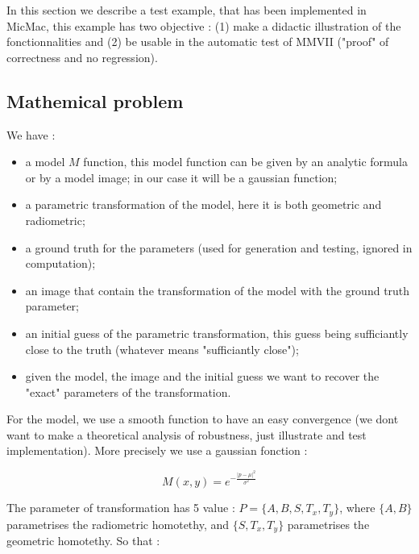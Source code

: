In this section we describe a test example, that has been implemented in MicMac, this example 
has two objective : (1) make a didactic illustration of the fonctionnalities and (2) 
be usable in the automatic test of MMVII ("proof" of correctness and no regression).

\subsection{Mathemical problem}

We have :

\begin {itemize}
    \item a model $M$  function, this model function can be given by an analytic  formula or by a model image;
          in our case it will be a gaussian function;

    \item a parametric transformation of the model, here it is both geometric and radiometric;

    \item a ground truth for the parameters (used for generation and testing, ignored in computation);

    \item an image that contain the transformation of the model with the ground truth parameter;

    \item an initial guess of the parametric transformation, this guess being sufficiantly close to the
	    truth (whatever means "sufficiantly close");

     \item given the model, the image and the initial guess we want to recover the "exact" parameters of the 
           transformation.

\end {itemize}

For the model, we use  a smooth function to have an easy convergence (we dont want to 
make a theoretical analysis of robustness, just illustrate and test implementation).
More precisely we use a gaussian fonction :

\begin{equation}
	M(x,y) =  e^{-\frac{|p-\mu|^2}{\sigma^2}}
\end{equation}

The  parameter of transformation has 5 value :  $P=\{A,B,S,T_x,T_y\}$, where $\{A,B\}$ parametrises
the radiometric homotethy,  and $\{S,T_x,T_y\}$ parametrises the geometric homotethy.
So that :


